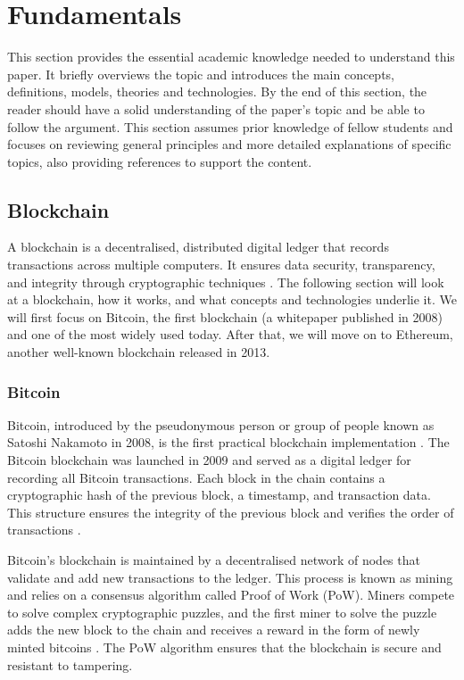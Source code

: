 \chapter {Fundamentals}
This section provides the essential academic knowledge needed to understand this paper. It briefly overviews the topic and introduces the main concepts, definitions, models, theories and technologies. By the end of this section, the reader should have a solid understanding of the paper's topic and be able to follow the argument. This section assumes prior knowledge of fellow students and focuses on reviewing general principles and more detailed explanations of specific topics, also providing references to support the content.

\section {Blockchain}
A blockchain is a decentralised, distributed digital ledger that records transactions across multiple computers. It ensures data security, transparency, and integrity through cryptographic techniques \cite{narayanan2016bitcoin}. The following section will look at a blockchain, how it works, and what concepts and technologies underlie it. We will first focus on Bitcoin, the first blockchain (a whitepaper published in 2008) and one of the most widely used today. After that, we will move on to Ethereum, another well-known blockchain released in 2013.

\subsection{Bitcoin}
Bitcoin, introduced by the pseudonymous person or group of people known as Satoshi Nakamoto in 2008, is the first practical blockchain implementation \cite{nakamoto2008bitcoin}. The Bitcoin blockchain was launched in 2009 and served as a digital ledger for recording all Bitcoin transactions. Each block in the chain contains a cryptographic hash of the previous block, a timestamp, and transaction data. This structure ensures the integrity of the previous block and verifies the order of transactions \cite{swan2015blockchain}.

Bitcoin's blockchain is maintained by a decentralised network of nodes that validate and add new transactions to the ledger. This process is known as mining and relies on a consensus algorithm called Proof of Work (PoW). Miners compete to solve complex cryptographic puzzles, and the first miner to solve the puzzle adds the new block to the chain and receives a reward in the form of newly minted bitcoins \cite{antonopoulos2014mastering}. The PoW algorithm ensures that the blockchain is secure and resistant to tampering.

